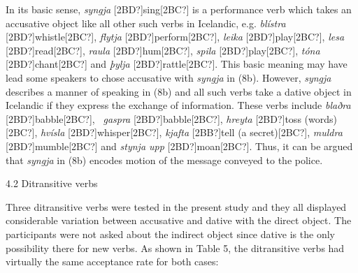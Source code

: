 \begin{styleStandard}
In its basic sense, \textit{syngja} [2BD?]sing[2BC?] is a performance verb which takes an accusative object like all other such verbs in Icelandic, e.g. \textit{blístra} [2BD?]whistle[2BC?], \textit{flytja} [2BD?]perform[2BC?], \textit{leika} [2BD?]play[2BC?], \textit{lesa} [2BD?]read[2BC?],\textit{ raula} [2BD?]hum[2BC?], \textit{spila} [2BD?]play[2BC?], \textit{tóna} [2BD?]chant[2BC?] and \textit{þylja} [2BD?]rattle[2BC?]. This basic meaning may have lead some speakers to chose accusative with \textit{syngja} in (8b). However, \textit{syngja} describes a manner of speaking in (8b) and all such verbs take a dative object in Icelandic if they express the exchange of information. These verbs include \textit{blaðra} [2BD?]babble[2BC?], \ \textit{gaspra} [2BD?]babble[2BC?],\textit{ hreyta} [2BD?]toss (words)[2BC?],\textit{ hvísla} [2BD?]whisper[2BC?], \textit{kjafta} [2BB?]tell (a secret)[2BC?], \textit{muldra} [2BD?]mumble[2BC?] and \textit{stynja upp} [2BD?]moan[2BC?]. Thus, it can be argued that \textit{syngja} in (8b) encodes motion of the message conveyed to the police. 
\end{styleStandard}

\begin{stylelsSectionii}
4.2 Ditransitive verbs
\end{stylelsSectionii}

\begin{styleStandard}
Three ditransitive verbs were tested in the present study and they all displayed considerable variation between accusative and dative with the direct object. The participants were not asked about the indirect object since dative is the only possibility there for new verbs. As shown in Table 5, the ditransitive verbs had virtually the same acceptance rate for both cases:
\end{styleStandard}

